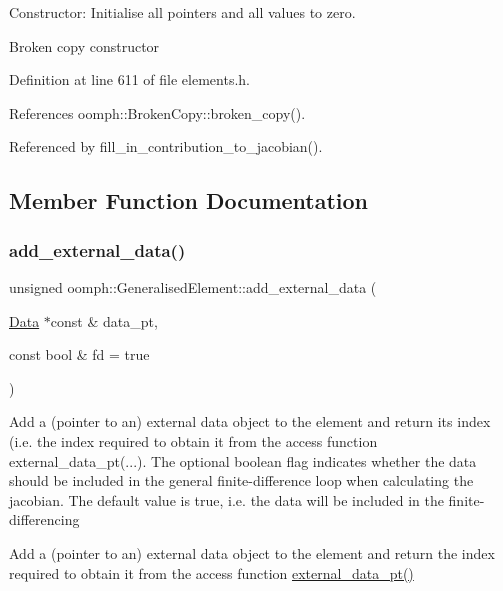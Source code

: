 Constructor\+: Initialise all pointers and all values to zero. 

Broken copy constructor 

Definition at line 611 of file elements.\+h.



References oomph\+::\+Broken\+Copy\+::broken\+\_\+copy().



Referenced by fill\+\_\+in\+\_\+contribution\+\_\+to\+\_\+jacobian().



\subsection{Member Function Documentation}
\mbox{\label{classoomph_1_1GeneralisedElement_afc58b505360aa5d172e50baad9aae46d}} 
\subsubsection{\texorpdfstring{add\+\_\+external\+\_\+data()}{add\_external\_data()}}
{\footnotesize\ttfamily unsigned oomph\+::\+Generalised\+Element\+::add\+\_\+external\+\_\+data (\begin{DoxyParamCaption}\item[{\hyperlink{classoomph_1_1Data}{Data} $\ast$const \&}]{data\+\_\+pt,  }\item[{const bool \&}]{fd = {\ttfamily true} }\end{DoxyParamCaption})}

Add a (pointer to an) external data object to the element and return its index (i.\+e. the index required to obtain it from the access function {\ttfamily external\+\_\+data\+\_\+pt}(...). The optional boolean flag indicates whether the data should be included in the general finite-\/difference loop when calculating the jacobian. The default value is true, i.\+e. the data will be included in the finite-\/differencing

Add a (pointer to an) external data object to the element and return the index required to obtain it from the access function {\ttfamily \hyperlink{classoomph_1_1GeneralisedElement_a3ec4e27a7a3d16122b00e2b5be0d1036}{external\+\_\+data\+\_\+pt()}} 

